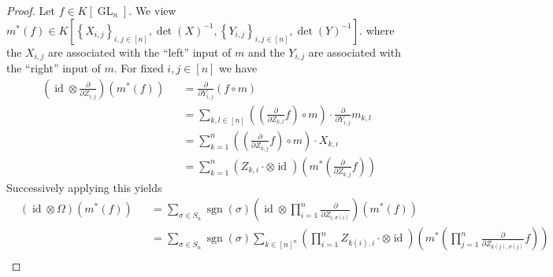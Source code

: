 \begin{proof}
  Let $f \in K \left\lbrack \operatorname{GL}_n \right\rbrack $.
  We view $ m^\ast(f) \in K \left\lbrack \left\{ X_{i,j} \right\}_{i,j \in [ n ]} , \operatorname{det} \left( X \right)^{-1} , \left\{ Y_{i,j} \right\}_{i,j \in [ n ]} , \operatorname{det} \left( Y \right)^{-1} \right\rbrack $. where the $X_{i,j}$ are associated with the ``left'' input of $m$ and the $Y_{i,j}$ are associated with the ``right'' input of $m$.
  For fixed $i,j \in [ n ] $ we have
  \begin{equation}
    \begin{aligned}
    &\left( \operatorname{id} \otimes \frac{\partial}{\partial Z_{i,j}} \right) \left( m^\ast \left( f \right) \right)
    &&= \frac{\partial}{\partial Y_{i,j}} \left( f \circ m \right)\\
    &&&= \sum_{k,l \in [ n ]} \left( \left( \frac{\partial}{\partial Z_{k,l}} f \right) \circ m \right) \cdot \frac{\partial}{\partial Y_{i,j}} m_{k,l} \\
    &&&= \sum_{k = 1}^n \left( \left( \frac{\partial}{\partial Z_{k,j}} f \right) \circ m \right) \cdot X_{k,i}\\
    &&&= \sum_{k=1}^n \left( Z_{k,i} {\cdot} \otimes \operatorname{id} \right) \left( m^\ast \left( \frac{\partial}{\partial Z_{k,j}} f \right) \right)
    \end{aligned}
  \end{equation}
  Successively applying this yields
  \begin{equation}
    \begin{aligned}
      &\left( \operatorname{id} \otimes \Omega \right) \left( m^\ast \left( f \right) \right)
      &&= \sum_{\sigma \in S_n} \operatorname{sgn} \left( \sigma \right) \left( \operatorname{id} \otimes \prod_{i=1}^n \frac{\partial}{\partial Z_{i,\sigma \left( i \right)}} \right) \left( m^\ast \left( f \right) \right) \\
      &&&= \sum_{\sigma \in S_n} \operatorname{sgn} \left( \sigma \right) \sum_{k \in [ n ]^n} \left( \prod_{i=1}^n Z_{k(i),i} {\cdot} \otimes \operatorname{id} \right) \left( m^\ast \left( \prod_{j=1}^n \frac{\partial}{\partial Z_{k(j),\sigma (j)}} f \right) \right) \\

\end{aligned}
\end{equation}
\end{proof}
